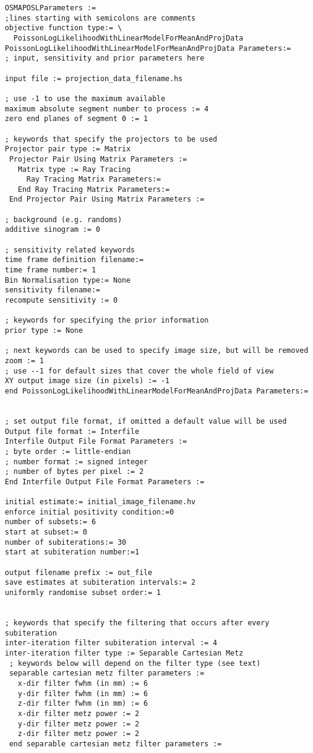 \documentclass{article}
\begin{document}
\begin{verbatim}
OSMAPOSLParameters :=
;lines starting with semicolons are comments
objective function type:= \
  PoissonLogLikelihoodWithLinearModelForMeanAndProjData
PoissonLogLikelihoodWithLinearModelForMeanAndProjData Parameters:=
; input, sensitivity and prior parameters here

input file := projection_data_filename.hs

; use -1 to use the maximum available
maximum absolute segment number to process := 4
zero end planes of segment 0 := 1

; keywords that specify the projectors to be used
Projector pair type := Matrix 
 Projector Pair Using Matrix Parameters := 
   Matrix type := Ray Tracing
     Ray Tracing Matrix Parameters:=
   End Ray Tracing Matrix Parameters:= 
 End Projector Pair Using Matrix Parameters :=

; background (e.g. randoms)
additive sinogram := 0

; sensitivity related keywords
time frame definition filename:=
time frame number:= 1
Bin Normalisation type:= None
sensitivity filename:=
recompute sensitivity := 0

; keywords for specifying the prior information
prior type := None

; next keywords can be used to specify image size, but will be removed
zoom := 1
; use --1 for default sizes that cover the whole field of view
XY output image size (in pixels) := -1
end PoissonLogLikelihoodWithLinearModelForMeanAndProjData Parameters:=


; set output file format, if omitted a default value will be used
Output file format := Interfile 
Interfile Output File Format Parameters := 
; byte order := little-endian 
; number format := signed integer 
; number of bytes per pixel := 2 
End Interfile Output File Format Parameters :=

initial estimate:= initial_image_filename.hv
enforce initial positivity condition:=0
number of subsets:= 6
start at subset:= 0
number of subiterations:= 30
start at subiteration number:=1

output filename prefix := out_file
save estimates at subiteration intervals:= 2
uniformly randomise subset order:= 1


; keywords that specify the filtering that occurs after every 
subiteration
inter-iteration filter subiteration interval := 4
inter-iteration filter type := Separable Cartesian Metz
 ; keywords below will depend on the filter type (see text)
 separable cartesian metz filter parameters := 
   x-dir filter fwhm (in mm) := 6 
   y-dir filter fwhm (in mm) := 6 
   z-dir filter fwhm (in mm) := 6 
   x-dir filter metz power := 2 
   y-dir filter metz power := 2 
   z-dir filter metz power := 2 
 end separable cartesian metz filter parameters := 



\end{verbatim}
\end{document}
